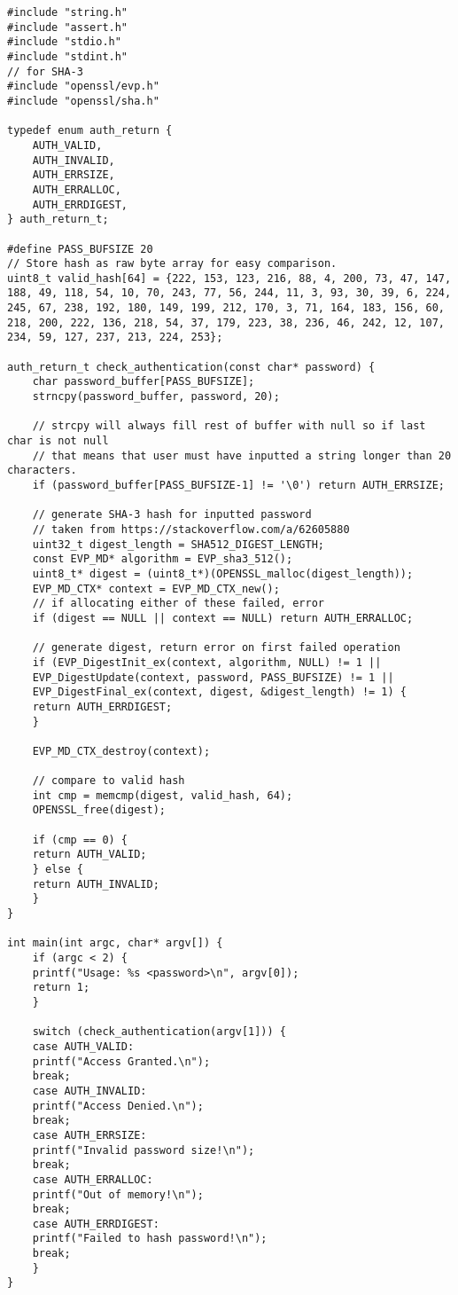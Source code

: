 \documentclass[11pt]{article}
\begin{document}
\begin{verbatim}
#include "string.h"
#include "assert.h"
#include "stdio.h"
#include "stdint.h"
// for SHA-3 
#include "openssl/evp.h"
#include "openssl/sha.h"

typedef enum auth_return {
    AUTH_VALID,
    AUTH_INVALID,
    AUTH_ERRSIZE,
    AUTH_ERRALLOC,
    AUTH_ERRDIGEST,
} auth_return_t;

#define PASS_BUFSIZE 20
// Store hash as raw byte array for easy comparison.
uint8_t valid_hash[64] = {222, 153, 123, 216, 88, 4, 200, 73, 47, 147, 188, 49, 118, 54, 10, 70, 243, 77, 56, 244, 11, 3, 93, 30, 39, 6, 224, 245, 67, 238, 192, 180, 149, 199, 212, 170, 3, 71, 164, 183, 156, 60, 218, 200, 222, 136, 218, 54, 37, 179, 223, 38, 236, 46, 242, 12, 107, 234, 59, 127, 237, 213, 224, 253};

auth_return_t check_authentication(const char* password) {
    char password_buffer[PASS_BUFSIZE];
    strncpy(password_buffer, password, 20);

    // strcpy will always fill rest of buffer with null so if last char is not null
    // that means that user must have inputted a string longer than 20 characters.
    if (password_buffer[PASS_BUFSIZE-1] != '\0') return AUTH_ERRSIZE;

    // generate SHA-3 hash for inputted password
    // taken from https://stackoverflow.com/a/62605880
    uint32_t digest_length = SHA512_DIGEST_LENGTH;
    const EVP_MD* algorithm = EVP_sha3_512();
    uint8_t* digest = (uint8_t*)(OPENSSL_malloc(digest_length));
    EVP_MD_CTX* context = EVP_MD_CTX_new();
    // if allocating either of these failed, error
    if (digest == NULL || context == NULL) return AUTH_ERRALLOC; 

    // generate digest, return error on first failed operation
    if (EVP_DigestInit_ex(context, algorithm, NULL) != 1 ||
	EVP_DigestUpdate(context, password, PASS_BUFSIZE) != 1 ||
	EVP_DigestFinal_ex(context, digest, &digest_length) != 1) {
	return AUTH_ERRDIGEST;
    }

    EVP_MD_CTX_destroy(context);

    // compare to valid hash
    int cmp = memcmp(digest, valid_hash, 64);
    OPENSSL_free(digest);

    if (cmp == 0) {
	return AUTH_VALID;
    } else {
	return AUTH_INVALID;
    }
}

int main(int argc, char* argv[]) {
    if (argc < 2) {
	printf("Usage: %s <password>\n", argv[0]);
	return 1;
    }

    switch (check_authentication(argv[1])) {
    case AUTH_VALID: 
	printf("Access Granted.\n");
	break;
    case AUTH_INVALID:
	printf("Access Denied.\n");
	break;
    case AUTH_ERRSIZE:
	printf("Invalid password size!\n");
	break;
    case AUTH_ERRALLOC:
	printf("Out of memory!\n");
	break;
    case AUTH_ERRDIGEST:
	printf("Failed to hash password!\n");
	break;	
    }   
}
\end{verbatim}
\end{document}
